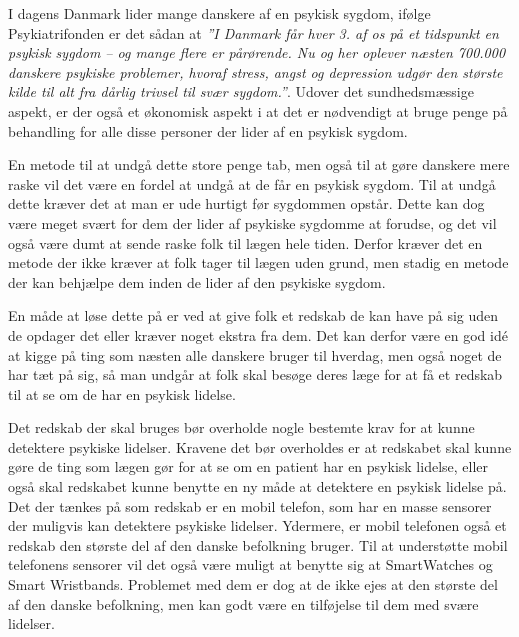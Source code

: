 


I dagens Danmark lider mange danskere af en psykisk sygdom, ifølge Psykiatrifonden er det sådan at \textit{''I Danmark får hver 3. af os på et tidspunkt en psykisk sygdom – og mange flere er pårørende. Nu og her oplever næsten 700.000 danskere psykiske problemer, hvoraf stress, angst og depression udgør den største kilde til alt fra dårlig trivsel til svær sygdom.''}\cite{psykiatrifonden}.
Udover det sundhedsmæssige aspekt, er der også et økonomisk aspekt i at det er nødvendigt at bruge penge på behandling for alle disse personer der lider af en psykisk sygdom.

En metode til at undgå dette store penge tab, men også til at gøre danskere mere raske vil det være en fordel at undgå at de får en psykisk sygdom.
Til at undgå dette kræver det at man er ude hurtigt før sygdommen opstår.
Dette kan dog være meget svært for dem der lider af psykiske sygdomme at forudse, og det vil også være dumt at sende raske folk til lægen hele tiden.
Derfor kræver det en metode der ikke kræver at folk tager til lægen uden grund, men stadig en metode der kan behjælpe dem inden de lider af den psykiske sygdom.

En måde at løse dette på er ved at give folk et redskab de kan have på sig uden de opdager det eller kræver noget ekstra fra dem.
Det kan derfor være en god idé at kigge på ting som næsten alle danskere bruger til hverdag, men også noget de har tæt på sig, så man undgår at folk skal besøge deres læge for at få et redskab til at se om de har en psykisk lidelse.

Det redskab der skal bruges bør overholde nogle bestemte krav for at kunne detektere psykiske lidelser.
Kravene det bør overholdes er at redskabet skal kunne gøre de ting som lægen gør for at se om en patient har en psykisk lidelse, eller også skal redskabet kunne benytte en ny måde at detektere en psykisk lidelse på.
Det der tænkes på som redskab er en mobil telefon, som har en masse sensorer der muligvis kan detektere psykiske lidelser. 
Ydermere, er mobil telefonen også et redskab den største del af den danske befolkning bruger.
Til at understøtte mobil telefonens sensorer vil det også være muligt at benytte sig at SmartWatches og Smart Wristbands.
Problemet med dem er dog at de ikke ejes at den største del af den danske befolkning, men kan godt være en tilføjelse til dem med svære lidelser.